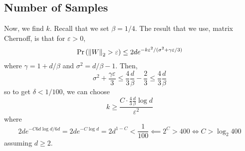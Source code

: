 \documentclass{article}
\begin{document}
\subsection{Number of Samples}
Now, we find $k$. Recall that we set $\beta = 1/4$. The result that we use, matrix Chernoff, is that for $\varepsilon>0$,
\[
	\Pr\left(\left\Vert W\right\Vert_2>\varepsilon\right)\leq 2de^{-k\varepsilon^2/(\sigma^2+\gamma\varepsilon/3)}
\]
where $\gamma = 1+d/\beta$ and $\sigma^2 = d/\beta - 1$. Then,
\[
	\sigma^2 + \frac{\gamma\varepsilon}3\leq \frac43\frac{d}{\beta} - \frac23\leq \frac43\frac{d}{\beta}
\]
so to get $\delta < 1/100$, we can choose
\[
	k\geq \frac{C\cdot \frac43\frac{d}{\beta}\log d}{\varepsilon^2}
\]
where
\[
	2de^{-C6d\log d/6d} = 2de^{-C\log d} = 2d^{1-C}<\frac1{100}\impliedby 2^C>400\iff C>\log_2 400
\]
assuming $d\geq 2$. 



\end{document}
